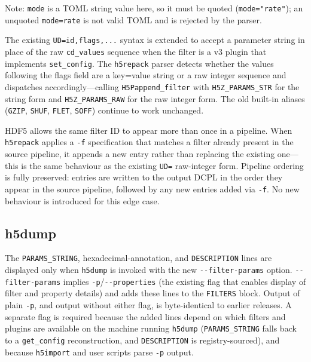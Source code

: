 \documentclass[../RFC-HDFG-2026-001.tex]{subfiles}
\begin{document}
Note: \texttt{mode} is a TOML string value here, so it must be quoted
(\texttt{mode="rate"}); an unquoted \texttt{mode=rate} is not valid TOML and
is rejected by the parser.

The existing \texttt{UD=id,flags,...} syntax is extended to accept a parameter
string in place of the raw \texttt{cd\_values} sequence when the filter is a v3
plugin that implements \texttt{set\_config}. The \texttt{h5repack} parser detects
whether the values following the flags field are a key=value string or a raw
integer sequence and dispatches accordingly---calling \texttt{H5Pappend\_filter}
with \texttt{H5Z\_PARAMS\_STR} for the string form and \texttt{H5Z\_PARAMS\_RAW}
for the raw integer form.
The old built-in aliases (\texttt{GZIP}, \texttt{SHUF}, \texttt{FLET}, \texttt{SOFF})
continue to work unchanged.

HDF5 allows the same filter ID to appear more than once in a pipeline.
When \texttt{h5repack} applies a \texttt{-f} specification that matches a
filter already present in the source pipeline, it appends a new entry
rather than replacing the existing one---this is the same behaviour as the
existing \texttt{UD=} raw-integer form.  Pipeline ordering is fully
preserved: entries are written to the output DCPL in the order they appear
in the source pipeline, followed by any new entries added via \texttt{-f}.
No new behaviour is introduced for this edge case.

\subsection{h5dump}

The \texttt{PARAMS\_STRING}, hexadecimal-annotation, and
\texttt{DESCRIPTION} lines are displayed only when \texttt{h5dump} is
invoked with the new \texttt{-{}-filter-params} option.
\texttt{-{}-filter-params} implies \texttt{-p}/\texttt{-{}-properties} (the
existing flag that enables display of filter and property details) and
adds these lines to the \texttt{FILTERS} block.  Output of plain
\texttt{-p}, and output without either flag, is byte-identical to earlier
releases.  A separate flag is required because the added lines depend on
which filters and plugins are available on the machine running
\texttt{h5dump} (\texttt{PARAMS\_STRING} falls back to a
\texttt{get\_config} reconstruction, and \texttt{DESCRIPTION} is
registry-sourced), and because \texttt{h5import} and user scripts parse
\texttt{-p} output.

\end{document}
